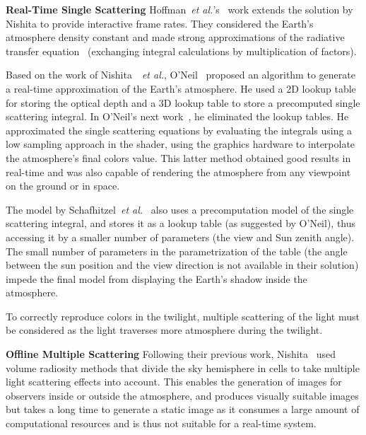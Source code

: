 \documentclass[journal]{vgtc}                %
\newcommand{\etal}{\emph{et al.}}
\newcommand{\review}[1]{{\color{blue}#1}}
\begin{document}
\noindent \textbf{Real-Time Single Scattering} \quad Hoffman~\etal's~\cite{Hoffman:2002} work extends the solution by Nishita to provide interactive frame rates. They \review{considered} the Earth's atmosphere density constant and made strong approximations of the radiative transfer equation~\cite{Chandrasekhar:1960, Mishchenko:2002} (exchanging \review{integral} calculations by multiplication of factors).

 \review{Based on the work of Nishita~\cite{Nishita:1993}~\etal, O'Neil~\cite{ONeil2004}} proposed an algorithm to generate a real-time approximation of the Earth's atmosphere. He used a 2D lookup table for storing the optical depth and a 3D lookup table to store a precomputed single scattering integral. \review{In O'Neil's next work~\cite{ONeil:2005}, he eliminated the lookup tables. He approximated the single scattering equations by evaluating the integrals using a low sampling approach in the shader, using the graphics hardware to interpolate the atmosphere's final colors value. This latter method obtained good results in real-time and was also capable of rendering the atmosphere from any viewpoint on the ground or in space.}

The model by Schafhitzel~\etal~\cite{Schafhitzel:2007} also uses a precomputation model of the single scattering integral\review{,} and stores it as a lookup table (as suggested by O'Neil), \review{thus} accessing it by a smaller number of parameters (the view and Sun zenith angle). The small number of parameters in the parametrization of the table (the angle between the sun position and the view direction is not available in their solution) \review{impede} the final model \review{from displaying} the Earth's shadow inside the atmosphere.



\review{To correctly reproduce colors in the twilight, multiple scattering of the light must be considered as the light traverses more atmosphere during the twilight.}

\noindent \textbf{Offline Multiple Scattering} \quad Following their previous work, Nishita~\cite{Nishita:1996} used volume radiosity methods that divide the sky \review{hemisphere} in cells to take multiple \review{light} scattering effects into account. This enables the generation of images for observers inside or outside the atmosphere, and produces visually suitable images but takes a long time to generate a static image as it consumes a large amount of computational resources and is thus not suitable for a real-time system.
\end{document}

